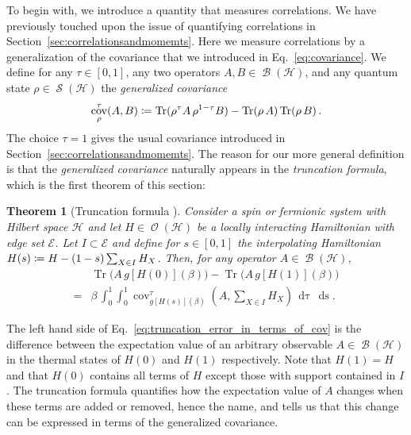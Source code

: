 \documentclass[a4paper,12pt,listof=totoc,index=totoc,bibliography=totoc,headsepline=false,headings=normal,BCOR16.153846mm,DIV12,headinclude,twoside,cleardoublepage=empty,numbers=noenddot,final]{scrreprt}
\theoremstyle{mystyle}
\numberwithin{equation}{section}
\numberwithin{figure}{section}
\numberwithin{lemma}{section}
\newtheorem{theorem}{Theorem}
\numberwithin{theorem}{section}
\numberwithin{corollary}{section}
\numberwithin{definition}{section}
\numberwithin{conjecture}{section}
\numberwithin{observation}{section}
\newcommand{\+}{\mkern2mu}
\newcommand{\coloneqq}{\mathrel{\vcentcolon\mkern-1.2mu=}} %
\newcommand{\texteqref}[1]{Eq.~\eqref{#1}}
\renewcommand{\H}{H}
\newcommand{\rhog}{g}
\newcommand{\Eset}{\mathcal{E}}
\newcommand{\dd}[1]{\mathop{\mathrm{d}#1}}
\DeclareMathOperator{\1}{\mathds{1}}
\DeclareMathOperator{\Bop}{\mathcal{B}}
\DeclareMathOperator{\Obs}{\mathcal{O}}
\DeclareMathOperator{\Qst}{\mathcal{S}}
\DeclareMathOperator{\Tr}{Tr}
\DeclareMathOperator{\cov}{cov}
\newcommand{\mc}[1]{\mathcal{#1}}
\newcommand{\mcH}{\mc{H}}
\begin{document}
To begin with, we introduce a quantity that measures correlations.
We have previously touched upon the issue of quantifying correlations in Section~\ref{sec:correlationsandmomemts}.
Here we measure correlations by a generalization of the covariance that we introduced in \texteqref{eq:covariance}.
We define for any $\tau \in [0,1]$, any two operators $A,B \in \Bop(\mcH)$, and any quantum state $\rho \in \Qst(\mcH)$ the \emph{generalized covariance}
\begin{equation} \label{eq:generalizedcovariance}
 \cov_\rho^\tau(A,B) 
 \coloneqq \Tr(\rho^\tau A\, \rho^{1-\tau} B) - \Tr(\rho\, A) \Tr(\rho \, B) \, .
\end{equation}
The choice $\tau = 1$ gives the usual covariance introduced in Section~\ref{sec:correlationsandmomemts}.
The reason for our more general definition is that the \emph{generalized covariance} naturally appears in the \emph{truncation formula}, which is the first theorem of this section:
\begin{theorem}[Truncation formula {\cite[Theorem~1]{Kliesch2013a}}] \label{thm:truncationformula}
  Consider a spin or fermionic system with Hilbert space $\mcH$ and let $\H \in \Obs(\mcH)$ be a locally interacting Hamiltonian with edge set $\Eset$.
  Let $I \subset \Eset$ and define for $s \in [0,1]$ the interpolating Hamiltonian $\H(s) \coloneqq \H - (1-s) \sum_{X \in I} \H_X$.
  Then, for any operator $A \in \Bop(\mcH)$,
  \begin{equation}\label{eq:truncation_error_in_terms_of_cov}
    \begin{split}
      &\Tr\bigl(A\,\rhog[\H(0)](\beta)\bigr)-\Tr\bigl(A\,\rhog[\H(1)](\beta)\bigr) \\
      = &\beta\,\int_0^1  \int_0^1 \cov_{\rhog[\H(s)](\beta)}^\tau(A, \sum_{X \in I} \H_X)\,\dd\tau\,\dd s .        
    \end{split}
  \end{equation}
\end{theorem}
The left hand side of \texteqref{eq:truncation_error_in_terms_of_cov} is the difference between the expectation value of an arbitrary observable $A \in \Bop(\mcH)$ in the thermal states of $\H(0)$ and $\H(1)$ respectively.
Note that $\H(1) = \H$ and that $\H(0)$ contains all terms of $\H$ except those with support contained in $I$.
The truncation formula quantifies how the expectation value of $A$ changes when these terms are added or removed, hence the name, and tells us that this change can be expressed in terms of the generalized covariance.
\end{document}
